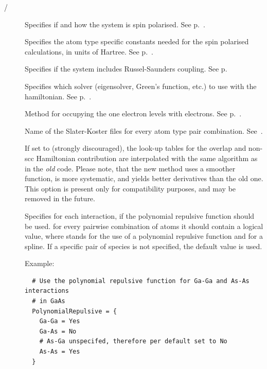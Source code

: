 \begin{description}
\item[ / ] Specifies if and how the system is spin
  polarised. See p.~.

\item[] Specifies the atom type specific constants needed for
  the spin polarised calculations, in units of Hartree.  See
  p.~.

\item[] Specifies if the system includes Russel-Saunders
  coupling. See p.~

\item[] Specifies which solver (eigensolver, Green's function, etc.)
  to use with the hamiltonian. See p.~.

\item[] Method for occupying the one electron levels with
  electrons. See p.~.

\item[] Name of the Slater-Koster files for every atom
  type pair combination. See~.

\item[] If set to  (strongly
  discouraged), the look-up tables for the overlap and non-scc
  Hamiltonian contribution are interpolated with the same algorithm as
  in the \emph{old} {\dftb} code. Please note, that the new method
  uses a smoother function, is more systematic, and yields better
  derivatives than the old one.  This option is present only for
  compatibility purposes, and may be removed in the future.

\item[] Specifies for each interaction, if the
  polynomial repulsive function should be used. for every pairwise
  combination of atoms it should contain a logical value, where
   stands for the use of a polynomial repulsive function and
   for a spline. If a specific pair of species is not
  specified, the default value  is used.

  Example:
\begin{verbatim}
  # Use the polynomial repulsive function for Ga-Ga and As-As interactions
  # in GaAs
  PolynomialRepulsive = {
    Ga-Ga = Yes
    Ga-As = No
    # As-Ga unspecifed, therefore per default set to No
    As-As = Yes
  }
\end{verbatim}


\end{description}
